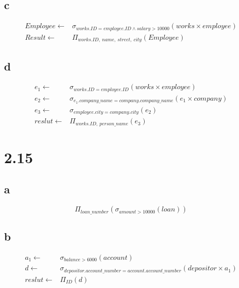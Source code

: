 \documentclass{article}
\begin{document}
    \subsection*{c} 
    \begin{equation*}
        \begin{split}
            Employee\leftarrow &\sigma_{works.ID=employee.ID\wedge salary>10000 }(works \times employee)\\
            Result\leftarrow & \Pi_{works.ID,\ name,\ street,\ city}(Employee)
        \end{split}
    \end{equation*}
    \subsection*{d}
    \begin{equation*}
        \begin{split}
            e_1\leftarrow & \sigma_{works.ID=employee.ID}(works\times employee)\\
            e_2\leftarrow & \sigma_{e_1.company\_name=company.company\_name}(e_1\times company)\\
            e_3\leftarrow & \sigma_{employee.city=company.city}(e_2)\\
            reslut\leftarrow & \Pi_{works.ID,\ person\_name}(e_3)
        \end{split}
    \end{equation*}
    \section*{2.15}
    \subsection*{a} $$\Pi_{loan\_number}(\sigma_{amount>10000}(loan ))$$
    \subsection*{b} 
    \begin{equation*}
        \begin{split}
            a_1\leftarrow & \sigma_{balance>6000}(account)\\
            d\leftarrow & \sigma_{depositor.account\_number=account.account\_number}(depositor\times a_1)\\
            reslut\leftarrow & \Pi_{ID}(d)
        \end{split}
    \end{equation*}
\end{document}

